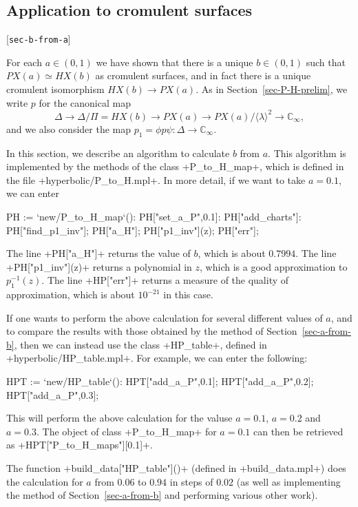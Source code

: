\documentclass[reqno]{amsart}
\newcommand{\lbl}[1]{\label{#1}\textup{[\texttt{#1}]}\par}
\newcommand{\lbl}{\label}
\newcommand{\Dl}        {\Delta}
\newcommand{\lm}        {\lambda}
\newcommand{\C}         {{\mathbb{C}}}
\newcommand{\ip}[1]     {\langle #1\rangle}
\renewcommand{\:}{\colon}
\theoremstyle{definition}
\begin{document}
\subsection{Application to cromulent surfaces}
\lbl{sec-b-from-a}

For each $a\in(0,1)$ we have shown that there is a unique $b\in(0,1)$
such that $PX(a)\simeq HX(b)$ as cromulent surfaces, and in fact there
is a unique cromulent isomorphism $HX(b)\to PX(a)$.  As in
Section~\ref{sec-P-H-prelim}, we write $p$ for the canonical map
\[ \Dl \to \Dl/\Pi = HX(b) \to PX(a) \to
    PX(a)/\ip{\lm}^2 \to \C_\infty,
\]
and we also consider the map $p_1=\phi p\psi\:\Dl\to\C_\infty$.

In this section, we describe an algorithm to calculate $b$ from $a$.
This algorithm is implemented by the methods of the class
\mcode+P_to_H_map+, which is defined in the file
\fname+hyperbolic/P_to_H.mpl+.  In more detail, if we want to
take $a=0.1$, we can enter
\begin{mcodeblock}
   PH := `new/P_to_H_map`():
   PH["set_a_P",0.1]:
   PH["add_charts"]:
   PH["find_p1_inv"];
   PH["a_H"];
   PH["p1_inv"](z);
   PH["err"];
\end{mcodeblock}
The line \mcode+PH["a_H"]+ returns the value of $b$, which is
about $0.7994$.  The line \mcode+PH["p1_inv"](z)+ returns a polynomial
in $z$, which is a good approximation to $p_1^{-1}(z)$.  The line
\mcode+HP["err"]+ returns a measure of the quality of approximation,
which is about $10^{-21}$ in this case.

If one wants to perform the above calculation for several different
values of $a$, and to compare the results with those obtained by the
method of Section~\ref{sec-a-from-b}, then we can instead use the
class \mcode+HP_table+, defined in \fname+hyperbolic/HP_table.mpl+.
For example, we can enter the following:
\begin{mcodeblock}
   HPT := `new/HP_table`():
   HPT["add_a_P",0.1];
   HPT["add_a_P",0.2];
   HPT["add_a_P",0.3];
\end{mcodeblock}
This will perform the above calculation for the valuse $a=0.1$,
$a=0.2$ and $a=0.3$.  The object of class \mcode+P_to_H_map+ for
$a=0.1$ can then be retrieved as \mcode+HPT["P_to_H_maps"][0.1]+.

The function \mcode+build_data["HP_table"]()+ (defined in
\fname+build_data.mpl+) does the calculation for $a$ from $0.06$ to
$0.94$ in steps of $0.02$ (as well as implementing the method of
Section~\ref{sec-a-from-b} and performing various other work).
\end{document}

